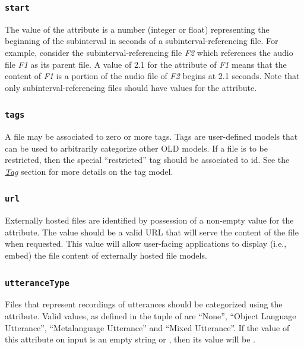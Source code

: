 \documentclass[letterpaper,10pt,english]{sphinxmanual}
\begin{document}
\subsubsection{\texttt{start}}
\label{datastructure:start}
The value of the  attribute is a number (integer or float) representing
the beginning of the subinterval in seconds of a subinterval-referencing file.
For example, consider the subinterval-referencing file \emph{F2} which references the
audio file \emph{F1} as its parent file.  A value of 2.1 for the  attribute
of \emph{F1} means that the content of \emph{F1} is a portion of the audio file of \emph{F2}
begins at 2.1 seconds.  Note that only subinterval-referencing files should have
values for the  attribute.


\subsubsection{\texttt{tags}}
\label{datastructure:id17}
A file may be associated to zero or more tags.  Tags are user-defined models
that can be used to arbitrarily categorize other OLD models.  If a file is to be
restricted, then the special ``restricted'' tag should be associated to id.  See
the {\hyperref[datastructure:tag-data-structure]{\emph{Tag}}} section for more details on the tag model.


\subsubsection{\texttt{url}}
\label{datastructure:id18}
Externally hosted files are identified by possession of a non-empty value for
the  attribute.  The value should be a valid URL that will serve the
content of the file when requested.  This value will allow user-facing
applications to display (i.e., embed) the file content of externally hosted
file models.


\subsubsection{\texttt{utteranceType}}
\label{datastructure:utterancetype}
Files that represent recordings of utterances should be categorized using the
 attribute.  Valid values, as defined in the 
tuple of  are ``None'', ``Object Language Utterance'', ``Metalanguage
Utterance'' and ``Mixed Utterance''.  If the value of this attribute on input is an
empty string or , then its value will be .
\end{document}
